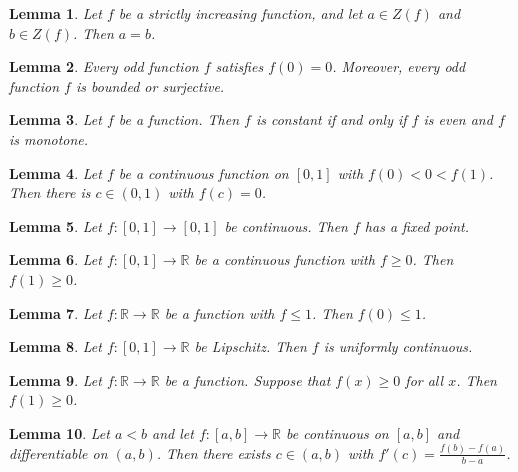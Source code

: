 \documentclass{article}
\newtheorem{lemma}{Lemma}
\begin{document}
\begin{lemma}\label{zeros}
Let $f$ be a strictly increasing function, and let $a\in Z(f)$ and $b\in Z(f)$. Then $a=b$.
\end{lemma}

\begin{lemma}\label{lipschitzconstant}
Every odd function $f$ satisfies $f(0)=0$. Moreover, every odd function $f$ is bounded or surjective.
\end{lemma}

\begin{lemma}\label{parity}
Let $f$ be a function. Then $f$ is constant if and only if $f$ is even and $f$ is monotone.
\end{lemma}

\begin{lemma}\label{function-on-interval}
Let $f$ be a continuous function on $[0,1]$ with $f(0)<0<f(1)$. Then there is $c\in(0,1)$ with $f(c)=0$.
\end{lemma}

\begin{lemma}\label{fixed-point}
Let $f\colon[0,1]\to[0,1]$ be continuous. Then $f$ has a fixed point.
\end{lemma}

\begin{lemma}\label{pointwise-order}
Let $f\colon[0,1]\to\mathbb{R}$ be a continuous function with $f\ge0$. Then $f(1)\ge0$.
\end{lemma}

\begin{lemma}\label{pointwise-bound}
Let $f\colon\mathbb{R}\to\mathbb{R}$ be a function with $f\le1$. Then $f(0)\le1$.
\end{lemma}

\begin{lemma}\label{uniform-on-interval}
Let $f\colon[0,1]\to\mathbb{R}$ be Lipschitz. Then $f$ is uniformly continuous.
\end{lemma}

\begin{lemma}\label{suppose-for-all}
Let $f\colon\mathbb{R}\to\mathbb{R}$ be a function. Suppose that $f(x)\ge0$ for all $x$. Then $f(1)\ge0$.
\end{lemma}

\begin{lemma}\label{mean-value}
Let $a<b$ and let $f\colon[a,b]\to\mathbb{R}$ be continuous on $[a,b]$ and differentiable on $(a,b)$. Then there exists $c\in(a,b)$ with $f'(c)=\frac{f(b)-f(a)}{b-a}$.
\end{lemma}
\end{document}
